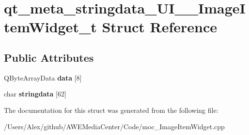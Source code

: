 \hypertarget{structqt__meta__stringdata___u_i_____image_item_widget__t}{\section{qt\-\_\-meta\-\_\-stringdata\-\_\-\-U\-I\-\_\-\-\_\-\-Image\-Item\-Widget\-\_\-t Struct Reference}
\label{structqt__meta__stringdata___u_i_____image_item_widget__t}
}
\subsection*{Public Attributes}
\begin{DoxyCompactItemize}
\item 
\hypertarget{structqt__meta__stringdata___u_i_____image_item_widget__t_adbc7bf69ff6857eb9dd9afdef30c87f3}{Q\-Byte\-Array\-Data {\bfseries data} \mbox{[}8\mbox{]}}\label{structqt__meta__stringdata___u_i_____image_item_widget__t_adbc7bf69ff6857eb9dd9afdef30c87f3}

\item 
\hypertarget{structqt__meta__stringdata___u_i_____image_item_widget__t_a56bd48d01851245d61921a76ba7e015e}{char {\bfseries stringdata} \mbox{[}62\mbox{]}}\label{structqt__meta__stringdata___u_i_____image_item_widget__t_a56bd48d01851245d61921a76ba7e015e}

\end{DoxyCompactItemize}


The documentation for this struct was generated from the following file\-:\begin{DoxyCompactItemize}
\item 
/\-Users/\-Alex/github/\-A\-W\-E\-Media\-Center/\-Code/moc\-\_\-\-Image\-Item\-Widget.\-cpp\end{DoxyCompactItemize}
